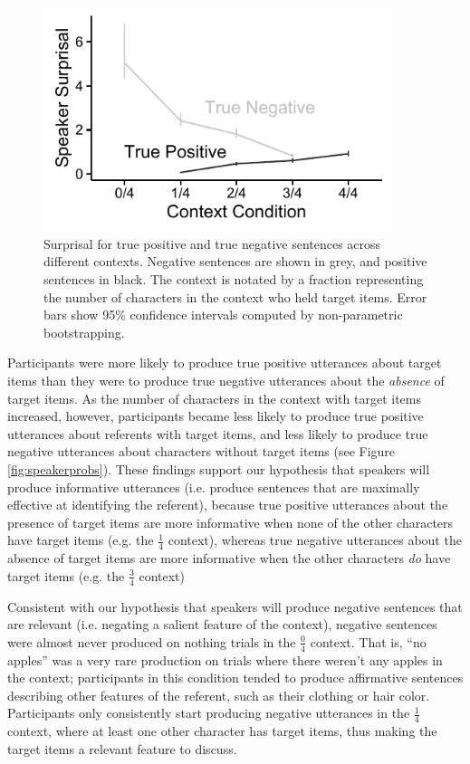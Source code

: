 \documentclass[man, noapacite]{apa2}
\begin{document}
\begin{figure}[t]
\begin{center} 
\includegraphics[width=4in]{figures/surprisals_mod.pdf}
\caption{\label{fig:speakersurprise} Surprisal for true positive and true negative sentences across different contexts. Negative sentences are shown in grey, and positive sentences in black.  The context is notated by a fraction representing the number of characters in the context who held target items. Error bars show 95\% confidence intervals computed by non-parametric bootstrapping.  }
\end{center} 
\end{figure}

Participants were more likely to produce true positive utterances about target items than they were to produce true negative utterances about the \emph{absence} of target items. As the number of characters in the context with target items increased, however, participants became less likely to produce true positive utterances about referents with target items, and less likely to produce true negative utterances about characters without target items (see Figure \ref{fig:speakerprobs}). These findings support our hypothesis that speakers will produce informative utterances (i.e. produce sentences that are maximally effective at identifying the referent), because true positive utterances about the presence of target items are more informative when none of the other characters have target items (e.g. the $\frac{1}{4}$ context), whereas true negative utterances about the absence of target items are more informative when the other characters \emph{do} have target items (e.g. the $\frac{3}{4}$ context)

Consistent with our hypothesis that speakers will produce negative sentences that are relevant (i.e. negating a salient feature of the context), negative sentences were almost never produced on nothing trials in the $\frac{0}{4}$ context. That is, ``no apples'' was a very rare production on trials where there weren't any apples in the context; participants in this condition tended to produce affirmative sentences describing other features of the referent, such as their clothing or hair color. Participants only consistently start producing negative utterances in the $\frac{1}{4}$ context, where at least one other character has target items, thus making the target items a relevant feature to discuss. 
\end{document}
